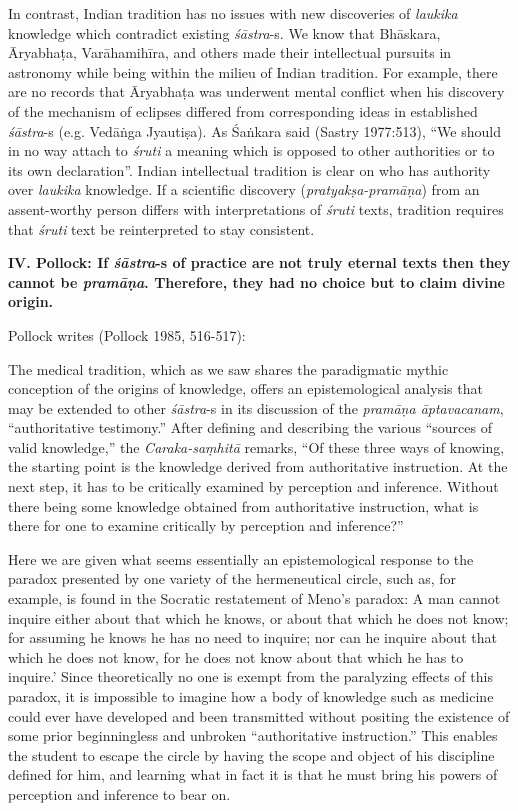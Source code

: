 In contrast, Indian tradition has no issues with new discoveries of {\sl laukika} knowledge which contradict existing {\sl śāstra}-s.  We know that Bhāskara, Āryabhaṭa, Varāhamihīra, and others made their intellectual pursuits in astronomy while being within the milieu of Indian tradition.  For example, there are no records that Āryabhaṭa was underwent mental conflict when his discovery of the mechanism of eclipses differed from corresponding ideas in established {\sl śāstra}-s (e.g. Vedāṅga Jyautiṣa). As Śaṅkara said (Sastry 1977:513), ``We should in no way attach to {\sl śruti} a meaning which is opposed to other authorities or to its own declaration''. Indian intellectual tradition is clear on who has authority over {\sl laukika} knowledge.  If a scientific discovery ({\sl pratyakṣa-pramāṇa}) from an assent-worthy person differs with interpretations of {\sl śruti} texts, tradition requires that {\sl śruti} text be reinterpreted to stay consistent.

{\bf IV. Pollock: If {{\sl\bfseries śāstra}\relax}-s of practice are not truly eternal texts then they cannot be {{\sl\bfseries pramāṇa}\relax}.  Therefore, they had no choice but to claim divine origin.}

Pollock writes (Pollock 1985, 516-517):

The medical tradition, which as we saw shares the paradigmatic mythic conception of the origins of knowledge, offers an epistemological analysis that may be extended to other {\sl śāstra}-s in its discussion of the {\sl pra\-māṇa āptavacanam}, ``authoritative testimony.''  After defining and describing the various ``sources of valid knowledge,'' the {\sl Caraka-saṃhitā} remarks, ``Of these three ways of knowing, the starting point is the knowledge derived from authoritative instruction. At the next step, it has to be critically examined by perception and inference. Without there being some knowledge obtained from authoritative instruction, what is there for one to examine critically by perception and inference?''

Here we are given what seems essentially an epistemological response to the paradox presented by one variety of the hermeneutical circle, such as, for example, is found in the Socratic restatement of Meno's paradox: A man cannot inquire either about that which he knows, or about that which he does not know; for assuming he knows he has no need to inquire; nor can he inquire about that which he does not know, for he does not know about that which he has to inquire.'  Since theoretically no one is exempt from the paralyzing effects of this paradox, it is impossible to imagine how a body of knowledge such as medicine could ever have developed and been transmitted without positing the existence of some prior beginningless and unbroken ``authoritative instruction.'' This enables the student to escape the circle by having the scope and object of his discipline defined for him, and learning what in fact it is that he must bring his powers of perception and inference to bear on.

